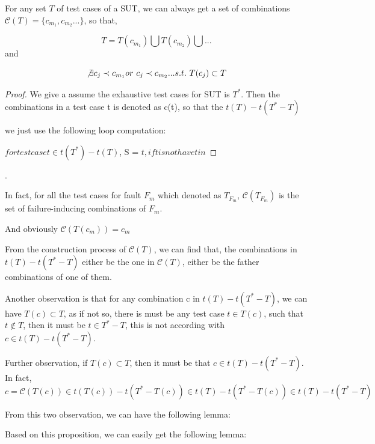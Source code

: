 \documentclass{sig-alternate}
\begin{document}
\begin{proposition}
For any set $T$ of test cases of a SUT, we can always get a set of combinations $\mathcal{C}(T) = \{c_{m_{1}},c_{m_{2}}...\}$, so that,

\begin{displaymath} T  = T(c_{m_{1}})\bigcup T(c_{m_{2}}) \bigcup ...\end{displaymath} and

\begin{displaymath} \not\exists c_{j} \prec  c_{m_{1}} or\  c_{j} \prec c_{m_{2}}... s.t.\  T(c_{j}) \subset T\end{displaymath}

\end{proposition}

\begin{proof}
We give a assume the exhaustive test cases for SUT is $T^{*}$. Then the combinations in a test case t is denoted as c(t), so that the   $t(T) - t(T^{*} - T)$

we just use the following loop computation:

$ for test case t \in t(T^{*}) - t(T)$,
 S = $ {t, if t is not have t in }$


\end{proof}.

In fact, for all the test cases for fault $F_{m}$ which denoted as $T_{F_{m}}$, $\mathcal{C}(T_{F_{m}})$ is the set of failure-inducing combinations of $F_{m}$.

And obviously $\mathcal{C}(T(c_{m})) = c_{m}$

From the construction process of $\mathcal{C}(T)$, we can find that, the combinations in $t(T) - t(T^{*} - T)$ either be the one in $\mathcal{C}(T)$, either be the father combinations of one of them. 

Another observation is that for any combination c in $t(T) - t(T^{*} - T) $, we can have $T(c) \subset T$, as if not so, there is must be any test case $t \in T(c)$, such that $t \not\in T$, then it must be $t \in T^{*} - T$, this is not according with  $c \in t(T) - t(T^{*} - T)$. 

Further observation, if $T(c) \subset T$, then it must be that $c \in t(T) - t(T^{*} - T) $.  In fact, $c = \mathcal{C}(T(c)) \in t(T(c)) - t(T^{*} - T(c)) \in t(T) - t(T^{*} - T(c)) \in t(T) - t(T^{*} - T) $

From this two observation, we can have the following lemma:

Based on this proposition, we can easily get the following lemma:
\end{document}
